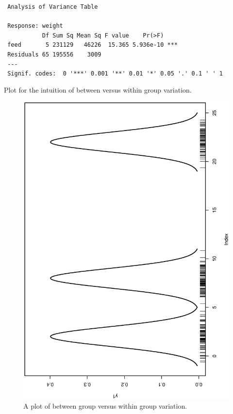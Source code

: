 \documentclass[captions=tableheading]{scrbook}
\begin{document}
\begin{verbatim}
 Analysis of Variance Table
 
 Response: weight
           Df Sum Sq Mean Sq F value    Pr(>F)    
 feed       5 231129   46226  15.365 5.936e-10 ***
 Residuals 65 195556    3009                      
 ---
 Signif. codes:  0 '***' 0.001 '**' 0.01 '*' 0.05 '.' 0.1 ' ' 1
\end{verbatim}

Plot for the intuition of between versus within group variation.







\begin{figure}[th]
  \includegraphics[angle=270, totalheight=4in]{ps/hypoth/Between-versus-within.ps}
  \caption[Between group versus within group variation]{A plot of between group versus within group variation.}
  \label{fig-Between-versus-within}
\end{figure}
\end{document}
